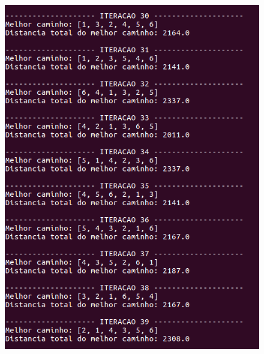 \documentclass[hidelinks,12pt]{article}
\begin{document}
		\begin{figure}[!h]
			\centering
			\includegraphics[scale=0.6]{Figures/m6-2-4.png}
		\end{figure}

		\newpage
\end{document}
